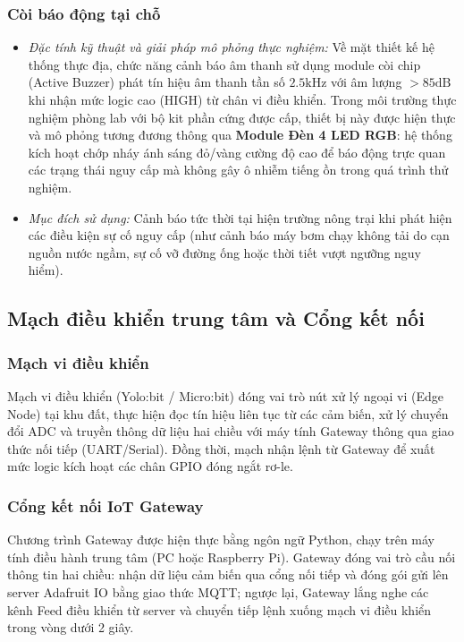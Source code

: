 \subsubsection{Còi báo động tại chỗ}
\begin{itemize}
    \item \textit{Đặc tính kỹ thuật và giải pháp mô phỏng thực nghiệm:} Về mặt thiết kế hệ thống thực địa, chức năng cảnh báo âm thanh sử dụng module còi chip (Active Buzzer) phát tín hiệu âm thanh tần số $2.5\text{kHz}$ với âm lượng $> 85\text{dB}$ khi nhận mức logic cao (HIGH) từ chân vi điều khiển. Trong môi trường thực nghiệm phòng lab với bộ kit phần cứng được cấp, thiết bị này được hiện thực và mô phỏng tương đương thông qua \textbf{Module Đèn 4 LED RGB}: hệ thống kích hoạt chớp nháy ánh sáng đỏ/vàng cường độ cao để báo động trực quan các trạng thái nguy cấp mà không gây ô nhiễm tiếng ồn trong quá trình thử nghiệm.
    \item \textit{Mục đích sử dụng:} Cảnh báo tức thời tại hiện trường nông trại khi phát hiện các điều kiện sự cố nguy cấp (như cảnh báo máy bơm chạy không tải do cạn nguồn nước ngầm, sự cố vỡ đường ống hoặc thời tiết vượt ngưỡng nguy hiểm).
\end{itemize}

\subsection{Mạch điều khiển trung tâm và Cổng kết nối}

\subsubsection{Mạch vi điều khiển}
Mạch vi điều khiển (Yolo:bit / Micro:bit) đóng vai trò nút xử lý ngoại vi (Edge Node) tại khu đất, thực hiện đọc tín hiệu liên tục từ các cảm biến, xử lý chuyển đổi ADC và truyền thông dữ liệu hai chiều với máy tính Gateway thông qua giao thức nối tiếp (UART/Serial). Đồng thời, mạch nhận lệnh từ Gateway để xuất mức logic kích hoạt các chân GPIO đóng ngắt rơ-le.

\subsubsection{Cổng kết nối IoT Gateway}
Chương trình Gateway được hiện thực bằng ngôn ngữ Python, chạy trên máy tính điều hành trung tâm (PC hoặc Raspberry Pi). Gateway đóng vai trò cầu nối thông tin hai chiều: nhận dữ liệu cảm biến qua cổng nối tiếp và đóng gói gửi lên server Adafruit IO bằng giao thức MQTT; ngược lại, Gateway lắng nghe các kênh Feed điều khiển từ server và chuyển tiếp lệnh xuống mạch vi điều khiển trong vòng dưới 2 giây.
